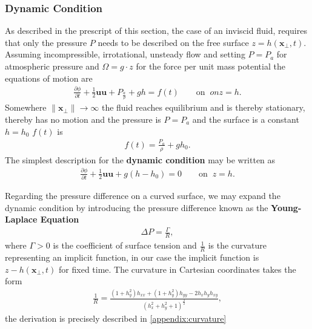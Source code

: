 \subsubsection{Dynamic Condition}
As described in the prescript of this section, the case of an inviscid fluid,
requires that only the pressure $P$ needs to be described on the free surface
$z = h(\mathbf{x}_\perp, t)$. Assuming incompressible, irrotational,
unsteady flow and setting $P=P_a$ for atmospheric pressure and $\Omega =
g\cdot z$ for the force per unit mass potential the equations of motion are
\begin{align}
    \frac{\partial \phi}{\partial t} +\frac{1}{2}\mathbf{u}\mathbf{u}
    + P_\frac{a}{\rho}+gh = f(t) \qquad \text{on}\;\; on z=h.
\end{align}
Somewhere $\|\mathbf{x}_\perp\| \rightarrow \infty$ the fluid reaches
equilibrium and is thereby stationary, thereby has no motion and the pressure
is $P=P_a$ and the surface is a constant $h = h_0$ $f(t)$ is
\begin{align}
    f(t) = \frac{P_a}{\rho}+gh_0.
\end{align}
The simplest description for the \textbf{dynamic condition} may be written as
\begin{align}
    \frac{\partial \phi}{\partial t}
    +\frac{1}{2}\mathbf{u}\mathbf{u}+g(h-h_0) = 0 \qquad \text{on}\;\; z=h.
\end{align}

Regarding the pressure difference on a curved surface, we may expand the
dynamic condition by introducing the pressure difference known as the
\textbf{Young-Laplace Equation}
\begin{align}
    \Delta P = \frac{\Gamma}{R},
\end{align}
where $\Gamma>0$ is the coefficient of surface tension and $\frac{1}{R}$ is
the curvature representing an implicit function, in our case the implicit
function is $z - h(\mathbf{x}_\perp, t)$ for fixed time. The curvature in
Cartesian coordinates takes the form
\begin{align}
    \frac{1}{R} = \frac{(1+h_y^2)h_{x x}+(1+h_y^2)h_{yy} -
    2h_xh_yh_{xy}}{\left( h_x^2+h_y^2+1 \right)^{\frac{3}{2}} },
\end{align}
the derivation is precisely described in \ref{appendix:curvature}



